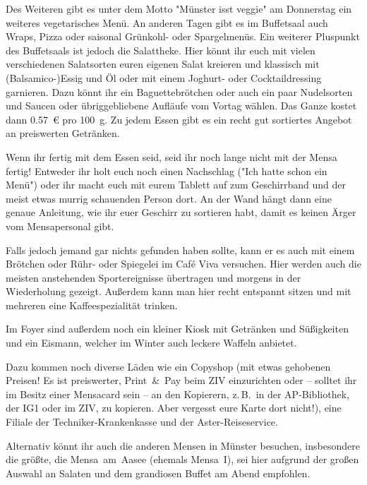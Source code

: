 \begin{multicols*}{2}
Des Weiteren gibt es unter dem Motto "Münster isst veggie" am Donnerstag ein weiteres vegetarisches Menü.
An anderen Tagen gibt es im Buffetsaal auch Wraps, Pizza oder saisonal Grünkohl- oder Spargelmenüs.
Ein weiterer Pluspunkt des Buffetsaals ist jedoch die Salattheke.
Hier könnt ihr euch mit vielen verschiedenen Salatsorten euren eigenen Salat kreieren und klassisch mit (Balsamico-)Essig und Öl oder mit einem Joghurt- oder Cocktaildressing garnieren.
Dazu könnt ihr ein Baguettebrötchen oder auch ein paar Nudelsorten und Saucen oder übriggebliebene Aufläufe vom Vortag wählen.
Das Ganze kostet dann \SI{0,57}{\euro} pro \SI{100}{\g}.
Zu jedem Essen gibt es ein recht gut sortiertes Angebot an preiswerten Getränken.

Wenn ihr fertig mit dem Essen seid, seid ihr noch lange nicht mit der Mensa fertig!
Entweder ihr holt euch noch einen Nachschlag ("Ich hatte schon ein Menü") oder ihr macht euch mit eurem Tablett auf zum Geschirrband und der meist etwas murrig schauenden Person dort.
An der Wand hängt dann eine genaue Anleitung, wie ihr euer Geschirr zu sortieren habt, damit es keinen Ärger vom Mensapersonal gibt.


Falls jedoch jemand gar nichts gefunden haben sollte, kann er es auch mit einem Brötchen oder Rühr- oder Spiegelei im Café Viva versuchen.
Hier werden auch die meisten anstehenden Sportereignisse übertragen und morgens in der Wiederholung gezeigt.
Außerdem kann man hier recht entspannt sitzen und mit mehreren eine Kaffeespezialität trinken.

Im Foyer sind außerdem noch ein kleiner Kiosk mit Getränken und Süßigkeiten und ein Eismann, welcher im Winter auch leckere Waffeln anbietet.

Dazu kommen noch diverse Läden wie ein Copyshop (mit etwas gehobenen Preisen!
Es ist preiswerter, Print~\&~Pay beim ZIV einzurichten oder -- solltet ihr im Besitz einer Mensacard sein -- an den Kopierern, z.\,B.\ in der AP-Bibliothek, der IG1 oder im ZIV, zu kopieren.
Aber vergesst eure Karte dort nicht!), eine Filiale der Techniker-Krankenkasse und der Aster-Reiseservice.

Alternativ könnt ihr auch die anderen Mensen in Münster besuchen, insbesondere die größte, die Mensa~am~Aasee (ehemals Mensa~I), sei hier aufgrund der großen Auswahl an Salaten und dem grandiosen Buffet am Abend empfohlen.

\end{multicols*}
